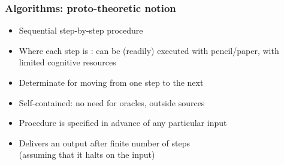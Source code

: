 \begin{frame}
\frametitle{Algorithms: proto-theoretic notion}

\begin{itemize}[<+->]

\item Sequential step-by-step procedure

\bi

\item Where each step is : can be (readily) executed with pencil/paper, with limited cognitive resources

\item Determinate  for moving from one step to the next

\item Self-contained: no need for oracles, outside sources %

\ei

\bigskip

\item Procedure is specified in advance of any particular input

\item Delivers an output after \textcolor{highlightA}{finite number} of steps \\ (assuming that it halts on the input)



\end{itemize}
\end{frame}

